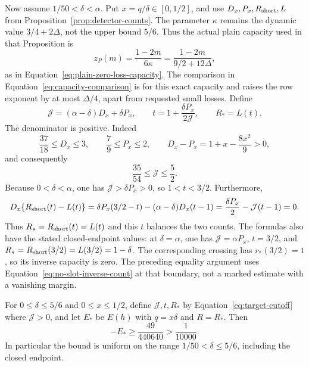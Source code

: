 Now assume \(1/50<\delta<\alpha\).  Put \(x=q/\delta\in[0,1/2]\),
and use \(D_x,P_x,R_{\rm short},L\) from
Proposition~\ref{prop:detector-counts}.  The parameter \(\kappa\)
remains the dynamic value \(3/4+2\Delta\), not the upper bound
\(5/6\).  Thus the actual plain capacity used in that Proposition is
\[
 z_P(m)=\frac{1-2m}{6\kappa}
       =\frac{1-2m}{9/2+12\Delta},
\]
as in Equation~\eqref{eq:plain-zero-loss-capacity}.  The comparison in
Equation~\eqref{eq:capacity-comparison} is for this exact capacity and
raises the row exponent by at most \(\Delta/4\), apart from requested
small losses.  Define
\begin{equation}
 \mathcal J=(\alpha-\delta)D_x+\delta P_x,\qquad
 t=1+\frac{\delta P_x}{2\mathcal J},\qquad
 R_*=L(t).
 \label{eq:target-cutoff}
\end{equation}
The denominator is positive.  Indeed
\[
 \frac{37}{18}\le D_x\le3,\qquad
 \frac79\le P_x\le2,\qquad
 D_x-P_x=1+x-\frac{8x^2}{9}>0,
\]
and consequently
\[
 \frac{35}{54}\le\mathcal J\le\frac52.
\]
Because \(0<\delta<\alpha\), one has
\(\mathcal J>\delta P_x>0\), so \(1<t<3/2\).
Furthermore,
\[
 D_x\{R_{\rm short}(t)-L(t)\}
 =\delta P_x(3/2-t)-(\alpha-\delta)D_x(t-1)
 =\frac{\delta P_x}{2}-\mathcal J(t-1)=0.
\]
Thus \(R_*=R_{\rm short}(t)=L(t)\) and this \(t\) balances the two counts.
The formulas also have the stated closed-endpoint values: at
\(\delta=\alpha\), one has \(\mathcal J=\alpha P_x\), \(t=3/2\),
and \(R_*=R_{\rm short}(3/2)=L(3/2)=1-\delta\).  The corresponding crossing
has \(r_*(3/2)=1\), so its inverse capacity is zero.  The preceding
equality argument uses Equation~\eqref{eq:no-slot-inverse-count} at
that boundary, not a marked estimate with a vanishing margin.

\begin{lemma}\label{lem:balanced-endpoint}
For \(0\le\delta\le5/6\) and \(0\le x\le1/2\), define
\(\mathcal J,t,R_*\) by Equation~\eqref{eq:target-cutoff} where
\(\mathcal J>0\), and let \(E_*\) be \(E(h)\) with
\(q=x\delta\) and \(R=R_*\).  Then
\[
 -E_*\ge\frac{49}{440640}>\frac1{10000}.
\]
In particular the bound is uniform on the range
\(1/50<\delta\le5/6\), including the closed endpoint.
\end{lemma}

